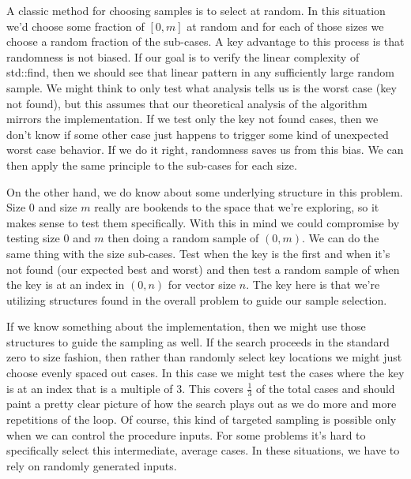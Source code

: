 \documentclass[]{tufte-handout}
\begin{document}
A classic method for choosing samples is to select at random. In this situation we'd choose some fraction of $[0,m]$ at random and for each of those sizes we choose a random fraction of the sub-cases. A key advantage to this process is that randomness is not biased.  If our goal is to verify the linear complexity of std::find, then we should see that linear pattern in any sufficiently large random sample. We might think to only test what analysis tells us is the worst case (key not found), but this assumes that our theoretical analysis of the algorithm mirrors the implementation. If we test only the key not found cases, then we don't know if some other case just happens to trigger some kind of unexpected worst case behavior. If we do it right, randomness saves us from this bias. We can then apply the same principle to the sub-cases for each size. 

On the other hand, we do know about some underlying structure in this problem.  Size 0 and size $m$ really are bookends to the space that we're exploring, so it makes sense to test them specifically.  With this in mind we could compromise by testing size 0 and $m$ then doing a random sample of $(0,m)$. We can do the same thing with the size sub-cases. Test when the key is the first and when it's not found (our expected best and worst) and then test a random sample of when the key is at an index in $(0,n)$ for vector size $n$. The key here is that we're utilizing structures found in the overall problem to guide our sample selection.

If we know something about the implementation, then we might use those structures to guide the sampling as well. If the search proceeds in the standard zero to size fashion, then rather than randomly select key locations we might just choose evenly spaced out cases. In this case we might test the cases where the key is at an index that is a multiple of $3$. This covers $\frac{1}{3}$ of the total cases and should paint a pretty clear picture of how the search plays out as we do more and more repetitions of the loop.  Of course, this kind of targeted sampling is possible only when we can control the procedure inputs.  For some problems it's hard to specifically select this intermediate, average cases. In these situations, we have to rely on randomly generated inputs. 





  
\end{document}
